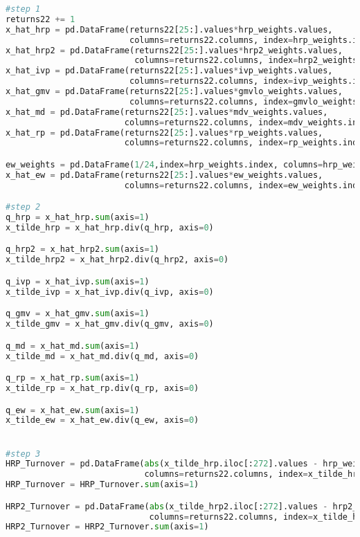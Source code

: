 \begin{lstlisting}[language=Python]
#step 1
returns22 += 1
x_hat_hrp = pd.DataFrame(returns22[25:].values*hrp_weights.values,
                         columns=returns22.columns, index=hrp_weights.index)
x_hat_hrp2 = pd.DataFrame(returns22[25:].values*hrp2_weights.values,
                          columns=returns22.columns, index=hrp2_weights.index)
x_hat_ivp = pd.DataFrame(returns22[25:].values*ivp_weights.values,
                         columns=returns22.columns, index=ivp_weights.index)
x_hat_gmv = pd.DataFrame(returns22[25:].values*gmvlo_weights.values,
                         columns=returns22.columns, index=gmvlo_weights.index)
x_hat_md = pd.DataFrame(returns22[25:].values*mdv_weights.values,
                        columns=returns22.columns, index=mdv_weights.index)
x_hat_rp = pd.DataFrame(returns22[25:].values*rp_weights.values,
                        columns=returns22.columns, index=rp_weights.index)

ew_weights = pd.DataFrame(1/24,index=hrp_weights.index, columns=hrp_weights.columns)
x_hat_ew = pd.DataFrame(returns22[25:].values*ew_weights.values,
                        columns=returns22.columns, index=ew_weights.index)

#step 2
q_hrp = x_hat_hrp.sum(axis=1)
x_tilde_hrp = x_hat_hrp.div(q_hrp, axis=0)

q_hrp2 = x_hat_hrp2.sum(axis=1)
x_tilde_hrp2 = x_hat_hrp2.div(q_hrp2, axis=0)

q_ivp = x_hat_ivp.sum(axis=1)
x_tilde_ivp = x_hat_ivp.div(q_ivp, axis=0)

q_gmv = x_hat_gmv.sum(axis=1)
x_tilde_gmv = x_hat_gmv.div(q_gmv, axis=0)

q_md = x_hat_md.sum(axis=1)
x_tilde_md = x_hat_md.div(q_md, axis=0)

q_rp = x_hat_rp.sum(axis=1)
x_tilde_rp = x_hat_rp.div(q_rp, axis=0)

q_ew = x_hat_ew.sum(axis=1)
x_tilde_ew = x_hat_ew.div(q_ew, axis=0)


#step 3
HRP_Turnover = pd.DataFrame(abs(x_tilde_hrp.iloc[:272].values - hrp_weights.iloc[1:].values),
                            columns=returns22.columns, index=x_tilde_hrp.iloc[:272].index)
HRP_Turnover = HRP_Turnover.sum(axis=1)

HRP2_Turnover = pd.DataFrame(abs(x_tilde_hrp2.iloc[:272].values - hrp2_weights.iloc[1:].values),
                             columns=returns22.columns, index=x_tilde_hrp2.iloc[:272].index)
HRP2_Turnover = HRP2_Turnover.sum(axis=1)


\end{lstlisting}
